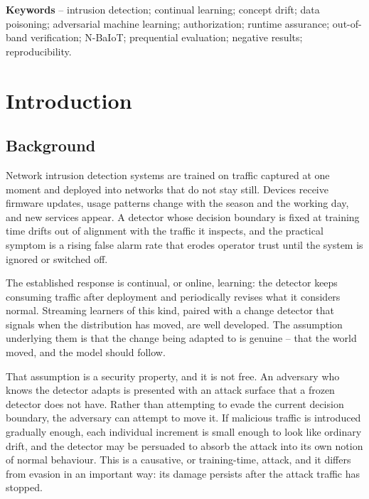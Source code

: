 \documentclass[12pt,a4paper]{report}
\begin{document}
\vspace{0.6cm}
\noindent\textbf{Keywords} -- intrusion detection; continual learning; concept
drift; data poisoning; adversarial machine learning; authorization; runtime
assurance; out-of-band verification; N-BaIoT; prequential evaluation; negative
results; reproducibility.

\newpage
\tableofcontents
\newpage

\chapter{Introduction}

\section{Background}

Network intrusion detection systems are trained on traffic captured at one
moment and deployed into networks that do not stay still. Devices receive
firmware updates, usage patterns change with the season and the working day, and
new services appear. A detector whose decision boundary is fixed at training
time drifts out of alignment with the traffic it inspects, and the practical
symptom is a rising false alarm rate that erodes operator trust until the system
is ignored or switched off.

The established response is continual, or online, learning: the detector keeps
consuming traffic after deployment and periodically revises what it considers
normal. Streaming learners of this kind, paired with a change detector that
signals when the distribution has moved, are well developed. The assumption
underlying them is that the change being adapted to is genuine -- that the world
moved, and the model should follow.

That assumption is a security property, and it is not free. An adversary who
knows the detector adapts is presented with an attack surface that a frozen
detector does not have. Rather than attempting to evade the current decision
boundary, the adversary can attempt to move it. If malicious traffic is
introduced gradually enough, each individual increment is small enough to look
like ordinary drift, and the detector may be persuaded to absorb the attack into
its own notion of normal behaviour. This is a causative, or training-time,
attack, and it differs from evasion in an important way: its damage persists
after the attack traffic has stopped.
\end{document}
